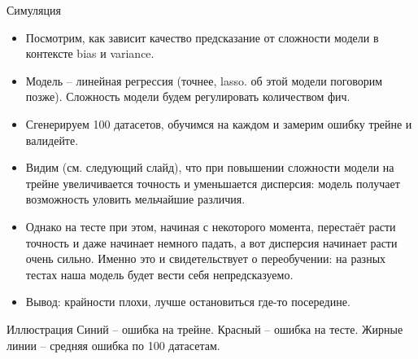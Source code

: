 \documentclass[9pt]{beamer}
\begin{document}

\begin{frame}{Симуляция}
\begin{itemize}
    \item Посмотрим, как зависит качество предсказание от сложности модели в контексте bias и variance.
    \item Модель -- линейная регрессия (точнее, lasso. об этой модели поговорим позже). Сложность модели будем регулировать количеством фич.
    \item Сгенерируем 100 датасетов, обучимся на каждом и замерим ошибку трейне и валидейте.
    \item Видим (см. следующий слайд), что при повышении сложности модели на трейне увеличивается точность и уменьшается дисперсия: модель получает возможность уловить мельчайшие различия.
    \item Однако на тесте при этом, начиная с некоторого момента, перестаёт расти точность и даже начинает немного падать, а вот дисперсия начинает расти очень сильно. Именно это и свидетельствует о переобучении: на разных тестах наша модель будет вести себя непредсказуемо.
    \item Вывод: крайности плохи, лучше остановиться где-то посередине.
\end{itemize}
\end{frame}

\begin{frame}{Иллюстрация}
    Синий -- ошибка на трейне. Красный -- ошибка на тесте. Жирные линии -- средняя ошибка по 100 датасетам.
\end{frame}
\end{document}
